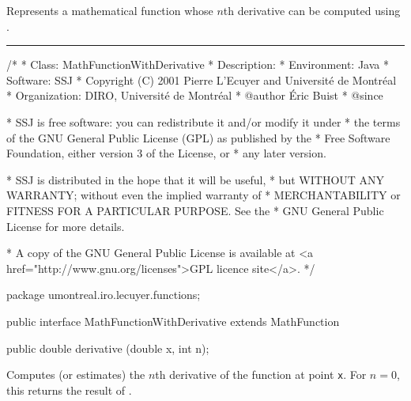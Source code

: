 
Represents a mathematical function whose
$n$th derivative can be computed using
.

\bigskip\hrule

\begin{code}
\begin{hide}
/*
 * Class:        MathFunctionWithDerivative
 * Description:  
 * Environment:  Java
 * Software:     SSJ 
 * Copyright (C) 2001  Pierre L'Ecuyer and Université de Montréal
 * Organization: DIRO, Université de Montréal
 * @author       Éric Buist
 * @since

 * SSJ is free software: you can redistribute it and/or modify it under
 * the terms of the GNU General Public License (GPL) as published by the
 * Free Software Foundation, either version 3 of the License, or
 * any later version.

 * SSJ is distributed in the hope that it will be useful,
 * but WITHOUT ANY WARRANTY; without even the implied warranty of
 * MERCHANTABILITY or FITNESS FOR A PARTICULAR PURPOSE.  See the
 * GNU General Public License for more details.

 * A copy of the GNU General Public License is available at
   <a href="http://www.gnu.org/licenses">GPL licence site</a>.
 */
\end{hide}
package umontreal.iro.lecuyer.functions;\begin{hide}

\end{hide}

public interface MathFunctionWithDerivative extends MathFunction\begin{hide} {
\end{hide}

   public double derivative (double x, int n);\begin{hide}
}\end{hide}
\end{code}
\begin{tabb}   
   Computes (or estimates) the $n$th derivative 
   of the function at point \texttt{x}.
   For $n=0$, this returns the result of 
   .
\end{tabb}
\begin{htmlonly}
\end{htmlonly}
